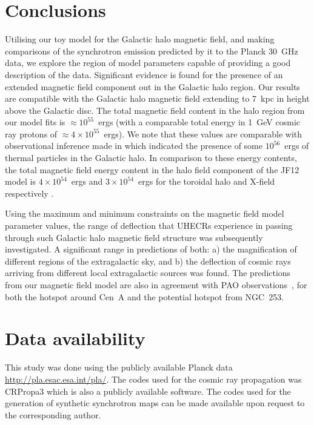 \documentclass[usenatbib]{mnras}
\begin{document}
\section{Conclusions}
\label{Conclusions}

Utilising our toy model for the Galactic halo magnetic field, and making comparisons of the synchrotron emission predicted by it to the Planck 30~GHz data, we explore the region of model parameters capable of providing a good description of the data. Significant evidence is found for the presence of an extended magnetic field component out in the Galactic halo region. Our results are compatible with the Galactic halo magnetic field extending to 7~kpc in height above the Galactic disc. The total magnetic field content in the halo region from our model fits is $\approx 10^{55}$~ergs (with a comparable total energy in 1~GeV cosmic ray protons of $\approx 4\times 10^{55}$~ergs). We note that these values are comparable with observational inference made in \cite{eROSITA} which indicated the presence of some $10^{56}$~ergs of thermal particles in the Galactic halo.
In comparison to these energy contents, the total magnetic field energy content in the halo field component of the JF12 model is $4\times 10^{54}$~ergs and $3\times  10^{54}$~ergs for the toroidal halo and X-field respectively \citep{Taylor_2019}.

Using the maximum and minimum constraints on the magnetic field model parameter values, the range of deflection that UHECRs experience in passing through such Galactic halo magnetic field structure was subsequently investigated. A significant range in predictions of both: a) the magnification of different regions of the extragalactic sky, and b) the deflection of cosmic rays arriving from different local extragalactic sources was found. The predictions from our magnetic field model are also in agreement with PAO observations~\citep{Auger_Starburst2018,Auger_ICRC_2021}, for both the hotspot around Cen~A and the potential hotspot from NGC~253.

\section*{Data availability}
This study was done using the publicly available Planck data \hyperlink{Planck}{http://pla.esac.esa.int/pla/}. The codes used for the cosmic ray propagation was CRPropa3 \citep{CRPropa3_2016} which is also a publicly available software. The codes used for the generation of synthetic synchrotron maps can be made available upon request to the corresponding author. 
\end{document}
